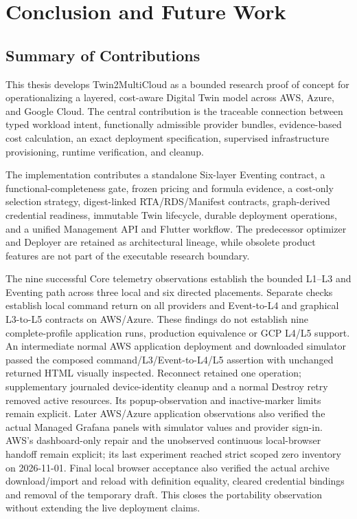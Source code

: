 \chapter{\label{chap:conclusion}Conclusion and Future Work}

\section{Summary of Contributions}

This thesis develops Twin2MultiCloud as a bounded research proof of concept for
operationalizing a layered, cost-aware Digital Twin model across AWS, Azure,
and Google Cloud. The central contribution is the traceable connection between
typed workload intent, functionally admissible provider bundles, evidence-based
cost calculation, an exact deployment specification, supervised
infrastructure provisioning, runtime verification, and cleanup.

The implementation contributes a standalone Six-layer Eventing contract, a
functional-completeness gate, frozen pricing and formula evidence, a cost-only
selection strategy, digest-linked RTA/RDS/Manifest contracts, graph-derived
credential readiness, immutable Twin lifecycle, durable deployment operations,
and a unified Management API and Flutter workflow. The predecessor optimizer
and Deployer are retained as architectural lineage, while obsolete product
features are not part of the executable research boundary.

The nine successful Core telemetry observations establish the bounded L1--L3
and Eventing path across three local and six directed placements. Separate
checks establish local command return on all providers and Event-to-L4 and
graphical L3-to-L5 contracts on AWS/Azure. These findings do not establish nine
complete-profile application runs, production equivalence or GCP L4/L5 support.
An intermediate normal AWS application deployment and downloaded simulator passed
the composed command/L3/Event-to-L4/L5 assertion with unchanged returned HTML
visually inspected. Reconnect retained one operation; supplementary journaled
device-identity cleanup and a normal Destroy retry removed active resources.
Its popup-observation and inactive-marker limits remain explicit.
Later AWS/Azure application observations also verified the actual Managed
Grafana panels with simulator values and provider sign-in. AWS's dashboard-only
repair and the unobserved continuous local-browser handoff remain explicit;
its last experiment reached strict scoped zero inventory on 2026-11-01.
Final local browser acceptance also verified the actual archive download/import
and reload with definition equality, cleared credential bindings and removal of
the temporary draft. This closes the portability observation without extending
the live deployment claims.

